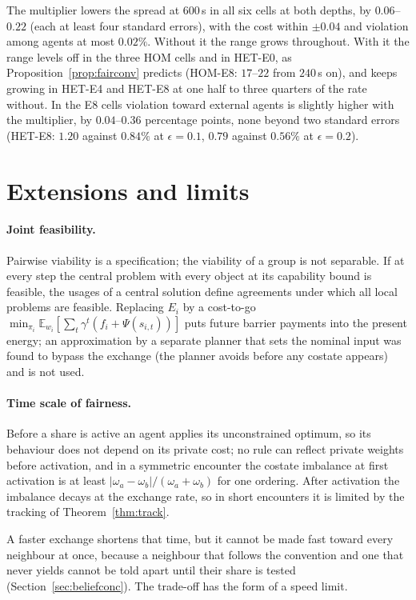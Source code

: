 \documentclass[11pt]{article}
\theoremstyle{definition}
\theoremstyle{remark}
\newcommand{\E}{\mathbb{E}}
\begin{document}
The multiplier lowers the spread at $600$\,s in all six cells at both depths, by $0.06$--$0.22$ (each at least four standard errors), with the cost within $\pm0.04$ and violation among agents at most $0.02\%$. Without it the range grows throughout. With it the range levels off in the three HOM cells and in HET-E0, as Proposition~\ref{prop:fairconv} predicts (HOM-E8: $17$--$22$ from $240$\,s on), and keeps growing in HET-E4 and HET-E8 at one half to three quarters of the rate without. In the E8 cells violation toward external agents is slightly higher with the multiplier, by $0.04$--$0.36$ percentage points, none beyond two standard errors (HET-E8: $1.20$ against $0.84\%$ at $\epsilon=0.1$, $0.79$ against $0.56\%$ at $\epsilon=0.2$).
\section{Extensions and limits}\label{sec:limits}
\paragraph{Joint feasibility.} Pairwise viability is a specification; the viability of a group is not separable. If at every step the central problem with every object at its capability bound is feasible, the usages of a central solution define agreements under which all local problems are feasible. Replacing $E_i$ by a cost-to-go $\min_{\pi_i}\E_{w_i}[\sum_t\gamma^t(f_i+\Psi(s_{i,t}))]$ puts future barrier payments into the present energy; an approximation by a separate planner that sets the nominal input was found to bypass the exchange (the planner avoids before any costate appears) and is not used.

\paragraph{Time scale of fairness.} Before a share is active an agent applies its unconstrained optimum, so its behaviour does not depend on its private cost; no rule can reflect private weights before activation, and in a symmetric encounter the costate imbalance at first activation is at least $|\omega_a-\omega_b|/(\omega_a+\omega_b)$ for one ordering. After activation the imbalance decays at the exchange rate, so in short encounters it is limited by the tracking of Theorem~\ref{thm:track}.

A faster exchange shortens that time, but it cannot be made fast toward every neighbour at once, because a neighbour that follows the convention and one that never yields cannot be told apart until their share is tested (Section~\ref{sec:beliefconc}). The trade-off has the form of a speed limit.
\end{document}

